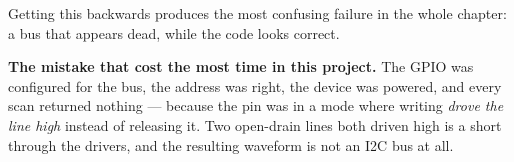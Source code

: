 Getting this backwards produces the most confusing failure in the whole chapter: a bus that
appears dead, while the code looks correct.

\begin{warningbox}
    \textbf{The mistake that cost the most time in this project.} The GPIO was configured for
    the bus, the address was right, the device was powered, and every scan returned nothing —
    because the pin was in a mode where writing  \emph{drove the line high}
    instead of releasing it. Two open-drain lines both driven high is a short through the
    drivers, and the resulting waveform is not an I2C bus at all.
\end{warningbox}
